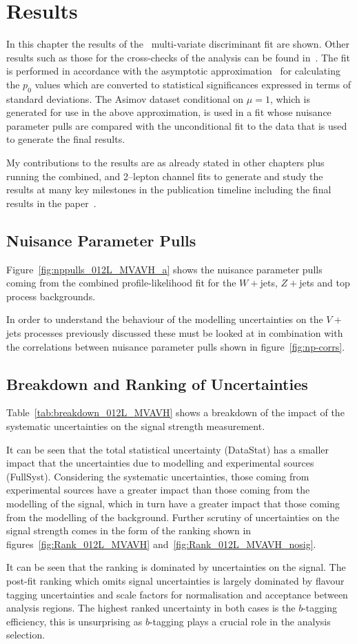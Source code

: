 \chapter{Results}%
\label{ch:results}
In this chapter the results of the \VHbb\ multi-variate discriminant fit are
shown. Other results such as those for the cross-checks of the analysis can be
found in~\cite{VHMainNote2019}. The fit is performed in accordance with the
asymptotic approximation~\cite{Cowan:2010js} for calculating the $p_0$ values
which are converted to statistical significances expressed in terms of standard
deviations. The Asimov dataset conditional on $\mu=1$, which is generated for
use in the above approximation, is used in a fit whose nuisance parameter pulls
are compared with the unconditional fit to the data that is used to generate the
final results.

My contributions to the results are as already stated in other chapters plus
running the combined, and 2--lepton channel fits to generate and study the
results at many key milestones in the publication timeline including the final
results in the paper~\cite{final-paper}.

\section{Nuisance Parameter Pulls}
Figure~\ref{fig:nppulls_012L_MVAVH_a} shows the nuisance parameter pulls coming
from the combined profile-likelihood fit for the $W+$jets, $Z+$jets and top
process backgrounds.

In order to understand the behaviour of the modelling
uncertainties on the $V+$jets processes previously discussed these must be
looked at in combination with the correlations between nuisance parameter pulls
shown in figure~\ref{fig:np-corrs}.

\clearpage
\section{Breakdown and Ranking of Uncertainties}
Table~\ref{tab:breakdown_012L_MVAVH} shows a breakdown of the impact of the
systematic uncertainties on the signal strength measurement.

It can be seen that the total statistical uncertainty (DataStat) has a smaller
impact that the uncertainties due to modelling and experimental sources
(FullSyst). Considering the systematic uncertainties, those coming from
experimental sources have a greater impact than those coming from the modelling
of the signal, which in turn have a greater impact  that those coming from the
modelling of the background. Further scrutiny of uncertainties on the signal
strength comes in the form of the ranking shown in
figures~\ref{fig:Rank_012L_MVAVH} and~\ref{fig:Rank_012L_MVAVH_nosig}.

It can be seen that the ranking is dominated by uncertainties on the signal. The
post-fit ranking which omits signal uncertainties is largely dominated by
flavour tagging uncertainties and scale factors for normalisation and acceptance
between analysis regions. The highest ranked uncertainty in both cases is the
$b$-tagging efficiency, this is unsurprising as $b$-tagging plays a crucial role
in the analysis selection.

